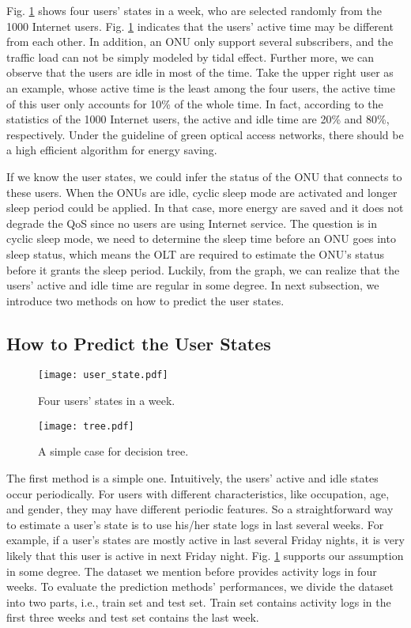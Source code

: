 \documentclass[journal]{IEEEtran}
\begin{document}
Fig. \ref{user_state} shows four users' states in a week, who are selected randomly from the 1000 Internet users. Fig. \ref{user_state} indicates that the users' active time may be different from each other. In addition, an ONU only support several subscribers, and the traffic load can not be simply modeled by tidal effect. Further more, we can observe that the users are idle in most of the time. Take the upper right user as an example, whose active time is the least among the four users, the active time of this user only accounts for 10\% of the whole time. In fact, according to the statistics of the 1000 Internet users, the active and idle time are 20\% and 80\%, respectively. Under the guideline of green optical access networks, there should be a high efficient algorithm for energy saving.

If we know the user states, we could infer the status of the ONU that connects to these users. When the ONUs are idle, cyclic sleep mode are activated and longer sleep period could be applied. In that case, more energy are saved and it does not degrade the QoS since no users are using Internet service. The question is in cyclic sleep mode, we need to determine the sleep time before an ONU goes into sleep status, which means the OLT are required to estimate the ONU's status before it grants the sleep period. Luckily, from the graph, we can realize that the users' active and idle time are regular in some degree. In next subsection, we introduce two methods on how to predict the user states.

\subsection{How to Predict the User States}

\begin{figure}[!t]
  \centering 
  \texttt{[image: user\_state.pdf]}\\ 
  \caption{ Four users' states in a week.}
  \label{user_state}
\end{figure}

\begin{figure}[!t]
  \centering 
  \texttt{[image: tree.pdf]}\\ 
  \caption{ A simple case for decision tree.}
  \label{tree}
\end{figure}

The first method is a simple one. Intuitively, the users' active and idle states occur periodically. For users with different characteristics, like occupation, age, and gender, they may have different periodic features. So a straightforward way to estimate a user's state is to use his/her state logs in last several weeks. For example, if a user's states are mostly active in last several Friday nights, it is very likely that this user is active in next Friday night. Fig. \ref{user_state} supports our assumption in some degree. The dataset we mention before provides activity logs in four weeks. To evaluate the prediction methods' performances, we divide the dataset into two parts, i.e., train set and test set. Train set contains activity logs in the first three weeks and test set contains the last week.
\end{document}
